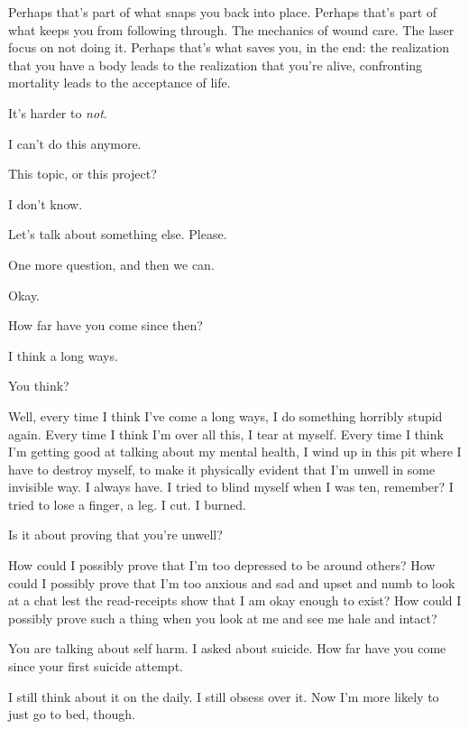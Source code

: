 \begin{paracol}{2}
\begin{leftcolumn}
\begin{ally}
Perhaps that's part of what snaps you back into place. Perhaps that's part of what keeps you from following through. The mechanics of wound care. The laser focus on not doing it. Perhaps that's what saves you, in the end: the realization that you have a body leads to the realization that you're alive, confronting mortality leads to the acceptance of life.
\end{ally}
It's harder to \emph{not}.
\newpage

\noindent I can't do this anymore.

\begin{ally}
This topic, or this project?
\end{ally}
I don't know.
\newpage

\noindent Let's talk about something else. Please.

\begin{ally}
One more question, and then we can.
\end{ally}
Okay.

\begin{ally}
How far have you come since then?
\end{ally}
I think a long ways.

\begin{ally}
You think?
\end{ally}
Well, every time I think I've come a long ways, I do something horribly stupid again. Every time I think I'm over all this, I tear at myself. Every time I think I'm getting good at talking about my mental health, I wind up in this pit where I have to destroy myself, to make it physically evident that I'm unwell in some invisible way. I always have. I tried to blind myself when I was ten, remember? I tried to lose a finger, a leg. I cut. I burned.

\begin{ally}
Is it about proving that you're unwell?
\end{ally}
How could I possibly prove that I'm too depressed to be around others? How could I possibly prove that I'm too anxious and sad and upset and numb to look at a chat lest the read-receipts show that I am okay enough to exist? How could I possibly prove such a thing when you look at me and see me hale and intact?

\begin{ally}
You are talking about self harm. I asked about suicide. How far have you come since your first suicide attempt.
\end{ally}
I still think about it on the daily. I still obsess over it. Now I'm more likely to just go to bed, though.


\end{leftcolumn}
\end{paracol}
